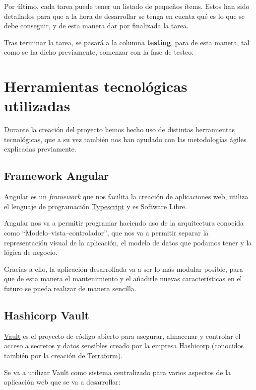 \documentclass{\ClassPath/viu-tfm-template}
\begin{document}
Por último, cada tarea puede tener un listado de pequeños ítems. Estos han sido detallados para que a la hora de desarrollar se tenga en cuenta qué es lo que se debe conseguir, y de esta manera dar por finalizada la tarea.

Tras terminar la tarea, se pasará a la columna \textbf{testing}, para de esta manera, tal como se ha dicho previamente, comenzar con la fase de testeo.


\chapter{Herramientas tecnológicas utilizadas}

Durante la creación del proyecto hemos hecho uso de distintas herramientas tecnológicas, que a su vez también nos han ayudado con las metodologías ágiles explicadas previamente.


\section{Framework Angular}

\href{https://angular.io/}{Angular} es un \textit{framework} que nos facilita la creación de aplicaciones web, utiliza el lenguaje de programación \href{https://www.typescriptlang.org/}{Typescript} y es Software Libre.

Angular nos va a permitir programar haciendo uso de la arquitectura conocida como “Modelo–vista–controlador”, que nos va a permitir separar la representación visual de la aplicación, el modelo de datos que podamos tener y la lógica de negocio.

Gracias a ello, la aplicación desarrollada va a ser lo más modular posible, para que de esta manera el mantenimiento y el añadirle nuevas características en el futuro se pueda realizar de manera sencilla.

\section{Hashicorp Vault}

\href{https://www.vaultproject.io/}{Vault} es el proyecto de código abierto para asegurar, almacenar y controlar el acceso a secretos y datos sensibles creado por la empresa \href{https://www.hashicorp.com/}{Hashicorp} (conocidos también por la creación de \href{https://www.terraform.io/}{Terraform}).

Se va a utilizar Vault como sistema centralizado para varios aspectos de la aplicación web que se va a desarrollar:
\end{document}
